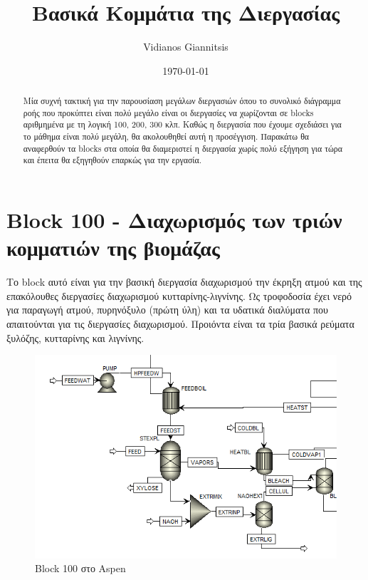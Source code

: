 \documentclass[11pt]{article}
\author{Vidianos Giannitsis}
\date{\today}
\title{Βασικά Κομμάτια της Διεργασίας}
\begin{document}
\maketitle
\tableofcontents

\renewcommand{\abstractname}{Περίληψη}
\renewcommand{\tablename}{Πίνακας}
\renewcommand{\figurename}{Σχήμα}
\renewcommand\listingscaption{Κώδικας}

\begin{abstract}
Μία συχνή τακτική για την παρουσίαση μεγάλων διεργασιών όπου το συνολικό διάγραμμα ροής που προκύπτει είναι πολύ μεγάλο είναι οι διεργασίες να χωρίζονται σε blocks αριθμημένα με τη λογική 100, 200, 300 κλπ. Καθώς η διεργασία που έχουμε σχεδιάσει για το μάθημα είναι πολύ μεγάλη, θα ακολουθηθεί αυτή η προσέγγιση. Παρακάτω θα αναφερθούν τα blocks στα οποία θα διαμεριστεί η διεργασία χωρίς πολύ εξήγηση για τώρα και έπειτα θα εξηγηθούν επαρκώς για την εργασία.
\end{abstract}

\section{Block 100 - Διαχωρισμός των τριών κομματιών της βιομάζας}
\label{sec:org40a08e8}
Το block αυτό είναι για την βασική διεργασία διαχωρισμού την έκρηξη ατμού και της επακόλουθες διεργασίες διαχωρισμού κυτταρίνης-λιγνίνης. Ως τροφοδοσία έχει νερό για παραγωγή ατμού, πυρηνόξυλο (πρώτη ύλη) και τα υδατικά διαλύματα που απαιτούνται για τις διεργασίες διαχωρισμού. Προιόντα είναι τα τρία βασικά ρεύματα ξυλόζης, κυτταρίνης και λιγνίνης.

\begin{figure}[htbp]
\centering
\includegraphics[width=.9\linewidth]{Block_100_-_Steam_Explosion/2023-01-10_18-30-22_screenshot.png}
\caption{Block 100 στο Aspen}
\end{figure}
\end{document}
